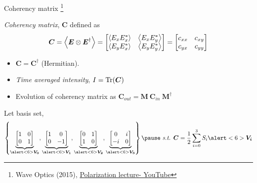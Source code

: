 \documentclass[12pt, dvipsnames]{beamer}
\numberwithin{equation}{section}
\newcommand\blfootnote[1]{%
	\begingroup
	\renewcommand\thefootnote{}\footnote{#1}%
	\addtocounter{footnote}{-1}%
	\endgroup
}
\begin{document}
\begin{frame}{Coherency matrix}\blfootnote{Wave Optics (2015), \href{https://www.youtube.com/watch?v=RowMxWt4mVE&list=LL&index=5}{Polarization lecture- YouTube}}
	\textit{Coherency matrix}, $\boldsymbol{C}$ defined as 
	\begin{align*}
		\boldsymbol{C}=
		\expval{\boldsymbol{E}\otimes\boldsymbol{E}^\dagger}=
			\begin{bmatrix}
				\expval{E_xE_x^\ast} & \expval{E_xE_y^\ast}\\
				\expval{E_yE_x^\ast} & \expval{E_yE_y^\ast}
			\end{bmatrix}=
		\begin{bmatrix}
			c_{xx} & c_{xy}\\
			c_{yx} & c_{yy}
		\end{bmatrix}
	\end{align*}\pause
	\begin{itemize}
		\item
		$\boldsymbol{C}=\boldsymbol{C}^\dagger$ (\alert<2>{Hermitian}).\pause
		
		\item 
		\textit{Time averaged intensity}, $I=\Tr(\boldsymbol{C})$\pause
		
		\item \alert<4>{Evolution of coherency matrix as 
		$\boldsymbol{C}_{out} =  \boldsymbol{M}\:\boldsymbol{C}_{in}\:\boldsymbol{M}^\dagger$} 
	\end{itemize}\pause

	Let basis set, 
	$$\left\{
	\underbrace{\begin{bmatrix}1 & 0 \\ 0 & 1\\\end{bmatrix}}_{\alert<6>{\boldsymbol{V_0}}},
	\underbrace{\begin{bmatrix}1 & 0 \\ 0 & -1\\\end{bmatrix}}_{\alert<6>{\boldsymbol{V_1}}},
	\underbrace{\begin{bmatrix}0 & 1 \\ 1 & 0\\\end{bmatrix}}_{\alert<6>{\boldsymbol{V_2}}},
	\underbrace{\begin{bmatrix}0 & i \\ -i & 0\\\end{bmatrix}}_{\alert<6>{\boldsymbol{V_3}}}
	\right\}\pause \text{ \textit{s.t.} } \boldsymbol{C} = \frac{1}{2} \sum_{i=0}^{3} S_i \alert<6>{\boldsymbol{V_i}}$$
\end{frame}
\end{document}
